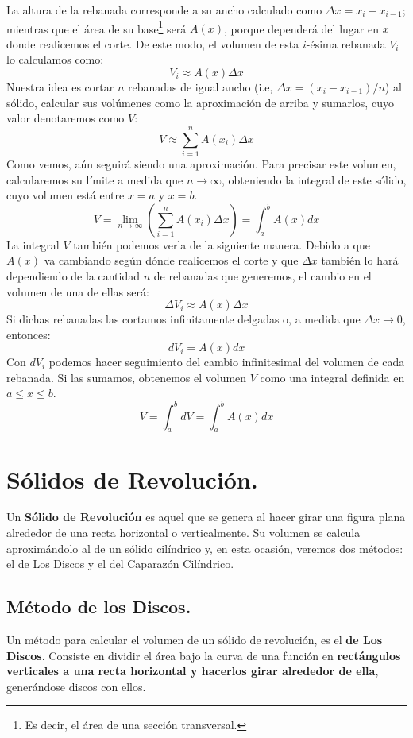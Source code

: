 \documentclass[12pt]{article}
\begin{document}
La altura de la rebanada corresponde a su ancho calculado como $\Delta x = x_{i} - x_{i - 1}$; mientras que el área de su base\footnote{Es decir, el área de una sección transversal.} será $A(x)$, porque dependerá del lugar en $x$ donde realicemos el corte. De este modo, el volumen de esta $i$-ésima rebanada $V_{i}$ lo calculamos como:
\[
  V_{i} \approx A(x) \Delta x
\]
Nuestra idea es cortar $n$ rebanadas de igual ancho (i.e, $\Delta x = (x_{i} - x_{i - 1})/n$) al sólido, calcular sus volúmenes como la aproximación de arriba y sumarlos, cuyo valor denotaremos como $V$:
\[
  V \approx \sum_{i = 1}^{n} A(x_{i}) \Delta x
\]
Como vemos, aún seguirá siendo una aproximación. Para precisar este volumen, calcularemos su límite a medida que $n \to \infty$, obteniendo la integral de este sólido, cuyo volumen está entre $x = a$ y $x = b$.
\[
  V = \lim_{n \to \infty} \left(\sum_{i = 1}^{n} A(x_{i}) \Delta x\right) = \int_{a}^{b} A(x)dx
\]
La integral $V$ también podemos verla de la siguiente manera. Debido a que $A(x)$ va cambiando según dónde realicemos el corte y que $\Delta x$ también lo hará dependiendo de la cantidad $n$ de rebanadas que generemos, el cambio en el volumen de una de ellas será:
\[
  \Delta V_{i} \approx A(x) \Delta x
\]
Si dichas rebanadas las cortamos infinitamente delgadas o, a medida que $\Delta x \to 0$, entonces:
\[
  dV_{i} = A(x) dx
\]
Con $dV_{i}$ podemos hacer seguimiento del cambio infinitesimal del volumen de cada rebanada. Si las sumamos, obtenemos el volumen $V$ como una integral definida en $a \leq x \leq b$.
\[
  V = \int_{a}^{b} dV = \int_{a}^{b} A(x)dx
\]


\section{Sólidos de Revolución.}

Un \textbf{Sólido de Revolución} es aquel que se genera al hacer girar una figura plana alrededor de una recta horizontal o verticalmente. Su volumen se calcula aproximándolo al de un sólido cilíndrico y, en esta ocasión, veremos dos métodos: el de Los Discos y el del Caparazón Cilíndrico.

\subsection{Método de los Discos.}

Un método para calcular el volumen de un sólido de revolución, es el \textbf{de Los Discos}. Consiste en dividir el área bajo la curva de una función en \textbf{rectángulos verticales a una recta horizontal y hacerlos girar alrededor de ella}, generándose discos con ellos.
\end{document}
